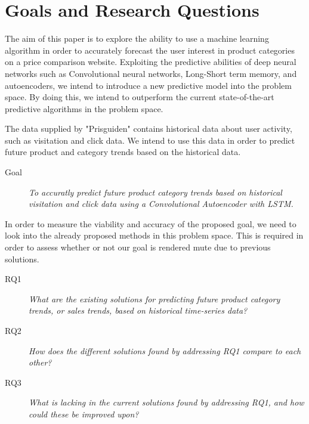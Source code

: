\section{Goals and Research Questions}
\label{section:Introduction:Goal}

The aim of this paper is to explore the ability to use a machine learning algorithm in order to accurately forecast the user interest in product categories on a price comparison website.
Exploiting the predictive abilities of deep neural networks such as Convolutional neural networks, Long-Short term memory, and autoencoders,
we intend to introduce a new predictive model into the problem space.
By doing this, we intend to outperform the current state-of-the-art predictive algorithms in the problem space.

The data supplied by "Prisguiden" contains historical data about user activity, such as visitation and click data.
We intend to use this data in order to predict future product and category trends based on the historical data.

\begin{description}
    \item[Goal]{\it To accuratly predict future product category trends based on historical visitation and click data using a Convolutional Autoencoder with LSTM.}
\end{description}

In order to measure the viability and accuracy of the proposed goal, we need to look into the already proposed methods in this problem space.
This is required in order to assess whether or not our goal is rendered mute due to previous solutions.


\begin{description}
    \item[RQ1]{\it What are the existing solutions for predicting future product category trends, or sales trends, based on historical time-series data?}
\end{description}

\begin{description}
    \item[RQ2]{\it How does the different solutions found by addressing RQ1 compare to each other?} 
\end{description}

\begin{description}
    \item[RQ3]{\it What is lacking in the current solutions found by addressing RQ1, and how could these be improved upon?}
\end{description}


